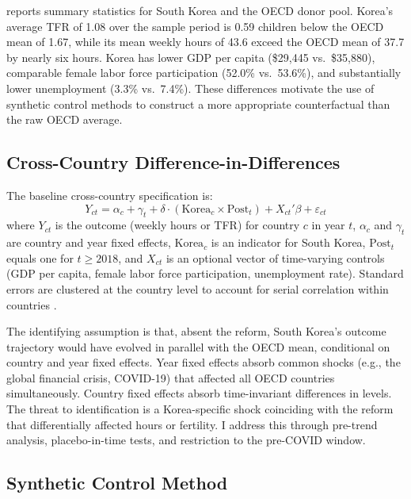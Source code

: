 \documentclass[12pt]{article}
\begin{document}
 reports summary statistics for South Korea and the OECD donor pool. Korea's average TFR of 1.08 over the sample period is 0.59 children below the OECD mean of 1.67, while its mean weekly hours of 43.6 exceed the OECD mean of 37.7 by nearly six hours. Korea has lower GDP per capita (\$29,445 vs.\ \$35,880), comparable female labor force participation (52.0\% vs.\ 53.6\%), and substantially lower unemployment (3.3\% vs.\ 7.4\%). These differences motivate the use of synthetic control methods to construct a more appropriate counterfactual than the raw OECD average.



\subsection{Cross-Country Difference-in-Differences}

The baseline cross-country specification is:
\begin{equation}
Y_{ct} = \alpha_c + \gamma_t + \delta \cdot (\text{Korea}_c \times \text{Post}_t) + X_{ct}'\beta + \varepsilon_{ct}
\label{eq:did}
\end{equation}
where $Y_{ct}$ is the outcome (weekly hours or TFR) for country $c$ in year $t$, $\alpha_c$ and $\gamma_t$ are country and year fixed effects, $\text{Korea}_c$ is an indicator for South Korea, $\text{Post}_t$ equals one for $t \geq 2018$, and $X_{ct}$ is an optional vector of time-varying controls (GDP per capita, female labor force participation, unemployment rate). Standard errors are clustered at the country level to account for serial correlation within countries \citep{bertrand2004much}.

The identifying assumption is that, absent the reform, South Korea's outcome trajectory would have evolved in parallel with the OECD mean, conditional on country and year fixed effects. Year fixed effects absorb common shocks (e.g., the global financial crisis, COVID-19) that affected all OECD countries simultaneously. Country fixed effects absorb time-invariant differences in levels. The threat to identification is a Korea-specific shock coinciding with the reform that differentially affected hours or fertility. I address this through pre-trend analysis, placebo-in-time tests, and restriction to the pre-COVID window.

\subsection{Synthetic Control Method}
\end{document}
